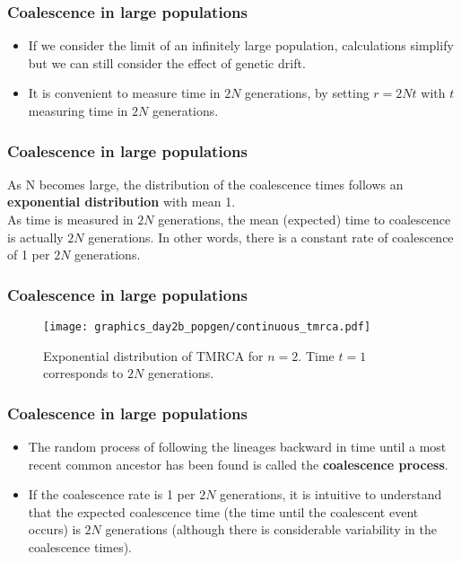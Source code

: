 \documentclass{beamer}
\newcommand{\1}{\ensuremath{\mathbf{1}}}
\begin{document}
\begin{frame}\frametitle{Coalescence in large populations}
	\begin{itemize}
		\item If we consider the limit of an infinitely large population, calculations simplify but we can still consider the effect of genetic drift.
		\item It is convenient to measure time in $2N$ generations, by setting $r = 2Nt$ with $t$ measuring time in $2N$ generations.
	\end{itemize}
\end{frame}
%
%
%
\begin{frame}\frametitle{Coalescence in large populations}
	As N becomes large, the distribution of the coalescence times follows an \textbf{exponential distribution} with mean 1.\\[2ex]
	As time is measured in $2N$ generations, the mean (expected) time to coalescence is actually $2N$ generations. In other words, there is a constant rate of coalescence of 1 per $2N$ generations.
\end{frame}
%
%
%
\begin{frame}\frametitle{Coalescence in large populations}
	\begin{figure}
	\begin{center}
		\texttt{[image: graphics\_day2b\_popgen/continuous\_tmrca.pdf]}
	\end{center}
	\caption{Exponential distribution of TMRCA for $n=2$. Time $t=1$ corresponds to $2N$ generations.}
	\end{figure}
\end{frame}
%
%
%
\begin{frame}\frametitle{Coalescence in large populations}
	\begin{itemize}
		\item The random process of following the lineages backward in time until a most recent common ancestor has been found is called the \textbf{coalescence process}.
		\item If the coalescence rate is 1 per $2N$ generations, it is intuitive to understand that the expected coalescence time (the time until the coalescent event occurs) is $2N$ generations (although there is considerable variability in the coalescence times).
	\end{itemize}
\end{frame}
\end{document}
